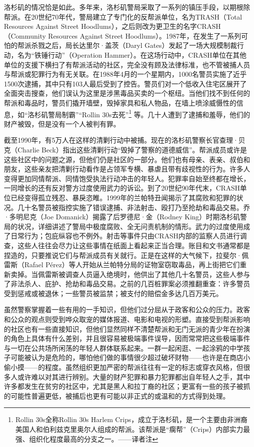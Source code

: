 \documentclass[fontset=fandol, a4paper, 12pt, openright]{ctexbook}
\begin{document}
洛杉矶的情况恰是如此。多年来，洛杉矶警局采取了一系列的镇压手段，以期根除帮派。在20世纪70年代，警局建立了专门化的反帮派单位，名为TRASH（Total Resources Against Street Hoodlums），之后则改为更卫生的名字CRASH（Community Resources Against Street Hoodlums）。1987年，在发生了一系列可怕的帮派杀戮之后，局长达里尔·盖茨（Daryl Gates）发起了一场大规模制裁行动，名为“铁锤行动”（Operation Hammer）。在这场行动中，CRASH单位在其他单位的支援下横扫了有帮派活动的社区，完全没有顾及法律标准，也不管被捕人员与帮派或犯罪行为有无关联。在1988年4月的一个星期内，1000名警员实施了近乎1500次逮捕，其中只有103人最后受到了控告。警员们对一个低收入住宅区展开了全面突击搜查，他们误认为这里是涉黑毒品买卖的一个枢纽。当他们找不到任何的帮派和毒品时，警员们撬开墙壁，毁掉家具和私人物品，在墙上喷涂威慑性的信息，如“洛杉矶警局制霸”“Rollin 30s去死”\footnote{Rollin 30s全称Rollin 30s Harlem Crips，成立于洛杉矶，是一个主要由非洲裔美国人和伯利兹克里奥尔人组成的帮派。该帮派是“瘸帮”（Crips）内部实力最强、组织化程度最高的分支之一。——译者注} 等。几十人遭到了逮捕和羞辱，他们的财产被毁，但是没有一个人被判有罪。

截至1990年，有5万人在这样的清剿行动中被捕。现在的洛杉矶警察长官查理·贝克（Charlie Beck）指出这些清剿行动“毁掉了警察的道德威信”。帮派成员或许是这些社区中的问题之源，但他们仍是社区的一部分。他们也有母亲、表亲、叔伯和朋友，这些亲友把清剿行动看作是占领军专横、暴虐且带有歧视性的行为。许多人变得更加同情帮派、同情饱受执法行动冲击的年轻人。犯罪率自始至终都在增长，一同增长的还有反对警方过度使用武力的诉讼。到了20世纪90年代末，CRASH单位已经变得孤立残忍、暴戾恣睢。1999年的兰帕特丑闻揭示了其腐败和犯罪的状况。几十名警员被指控实施了错误逮捕、非法射击、殴打乃至抢劫和毒品交易。乔·多明尼克（Joe Domanick）揭露了后罗德尼·金（Rodney King）时期洛杉矶警局的状况，详细讲述了警局中极度腐败、全无问责机制的情形。武力的过度使用成了日常行为；包庇纵容也不例外。射击等事件只由CRASH内部的监察人员进行调查，这些人往往会尽力让这些事情在纸面上看起来正当合理。账目和文书通常都是捏造的，只要推说它们与帮派成员有关就行。正是在这样的大气候下，拉斐尔·佩雷斯（Rafael Pérez）等人开始从兰帕特分局的证物室窃取毒品，再上街把它们重新卖掉。当佩雷斯被调查人员逼入绝境时，他供出了其他几十名警员，这些人参与了非法杀人、庇护、抢劫和毒品交易。之前的几百桩罪案必须推翻重查：许多警员受到惩戒或被退休；一些警员被监禁；被支付的赔偿金多达几百万美元。

虽然警察掌握着一些有用的一手知识，但他们过分屈从于政客和公众的压力。政客和公众的观点则受到哗众取宠的媒体报道、电影和电视的形塑。直接受到帮派影响的社区也有一些直接知识，但他们显然同样不清楚帮派和无门无派的青少年在扮演的角色上具体有什么差别，并且很容易被极端事件误导，因而常常把这些极端事件与一切在公共场所闲荡的年轻人群体联系起来。一群一起闲逛、一起涂鸦的中学孩子可能被认为是危险的，哪怕他们做的事情很少超过破坏财物——也许是在商店小偷小摸——的程度。虽然组织更加严密的帮派往往有一定的标志或穿衣风格，但很多人或许难以对其进行辨别。大量的财产犯罪和暴力犯罪都出自年轻人之手，其中许多都发生在贫穷的社区中，尤其是黑人和拉丁裔的社区；更富有一些的孩子被抓的可能性普遍更低，被捕后也更有可能以非正式的或温和的方式得到处理。
\end{document}
